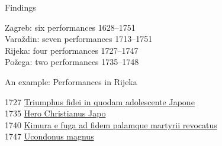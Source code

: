\documentclass[14pt]{beamer}
\begin{document}
{
    \begin{frame}[plain]
    \end{frame}
    }

\begin{frame}{Findings}

Zagreb: \alert{six} performances 1628–1751\\
Varaždin: \alert{seven} performances 1713–1751\\
Rijeka: \alert{four} performances 1727–1747\\
Požega: \alert{two} performances 1735–1748

\end{frame}

\begin{frame}{An example: Performances in Rijeka}

\alert{1727} \href{http://solr.ffzg.hr/basex/dramata/croala.drama.d1e20464}{Triumphus fidei in quodam adolescente Japone}\\
\alert{1735} \href{http://solr.ffzg.hr/basex/dramata/croala.drama.d1e25068}{Hero Christianus Japo}\\
\alert{1740} \href{http://solr.ffzg.hr/basex/dramata/croala.drama.d1e27940}{Kimura e fuga ad fidem palamque martyrii revocatus}\\
\alert{1747} \href{http://solr.ffzg.hr/basex/dramata/croala.drama.d1e32238}{Ucondonus magnus}

\end{frame}
\end{document}
